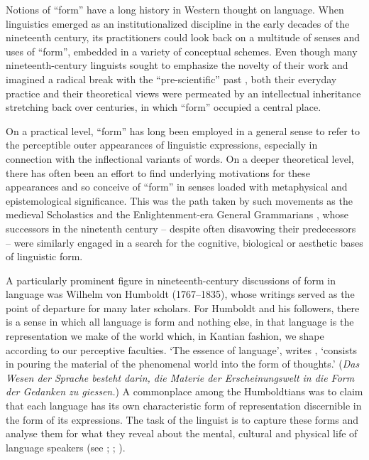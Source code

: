\begin{refsection}

Notions of ``form'' have a long history in Western thought on language. When linguistics emerged as an institutionalized discipline in the early decades of the nineteenth century, its practitioners could look back on a multitude of senses and uses of ``form'', embedded in a variety of conceptual schemes. Even though many nineteenth-century linguists sought to emphasize the novelty of their work and imagined a radical break with the ``pre-scientific'' past \citep[see][chap. 1]{MorpurgoDavies1998}, both their everyday practice and their theoretical views were permeated by an intellectual inheritance stretching back over centuries, in which ``form'' occupied a central place.

On a practical level, ``form'' has long been employed in a general sense to refer to the perceptible outer appearances of linguistic expressions, especially in connection with the inflectional variants of words. On a deeper theoretical level, there has often been an effort to find underlying motivations for these appearances and so conceive of ``form'' in senses loaded with metaphysical and epistemological significance. This was the path taken by such movements as the medieval Scholastics and the Enlightenment-era General Grammarians \citep[see][chaps. 8 and 11]{Law2003}, whose successors in the ninetenth century – despite often disavowing their predecessors – were similarly engaged in a search for the cognitive, biological or aesthetic bases of linguistic form. 

A particularly prominent figure in nineteenth-century discussions of form in language was Wilhelm von Humboldt (1767–1835), whose writings served as the point of departure for many later scholars. For Humboldt and his followers, there is a sense in which all language is form and nothing else, in that language is the representation we make of the world which, in Kantian fashion, we shape according to our perceptive faculties. `The essence of language', writes \citet[17]{Humboldt19051820}, `consists in pouring the material of the phenomenal world into the form of thoughts.' (\emph{Das Wesen der Sprache besteht darin, die Materie der Erscheinungswelt in die Form der Gedanken zu giessen.}) A commonplace among the Humboldtians was to claim that each language has its own characteristic form of representation discernible in the form of its expressions. The task of the linguist is to capture these forms and analyse them for what they reveal about the mental, cultural and physical life of language speakers (see \citealt[chap. 5]{MorpurgoDavies1998}; \citealt{Trabant1986}; \citealt{McElvenny2016}). 


\end{refsection}
